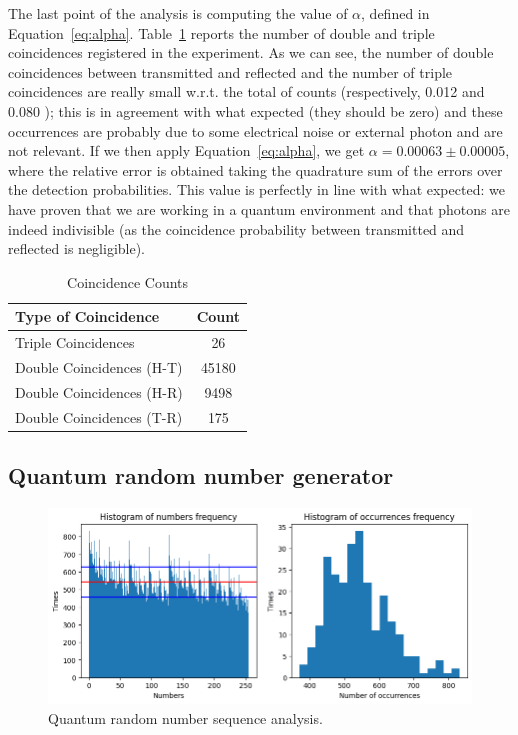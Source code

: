 \documentclass[prl,twocolumn]{revtex4-1}
\begin{document}
The last point of the analysis is computing the value of $\alpha$, defined in Equation~\eqref{eq:alpha}. Table~\ref{tab:coincidences} reports the number of double and triple coincidences registered in the experiment. As we can see, the number of double coincidences between transmitted and reflected and the number of triple coincidences are really small w.r.t. the total of counts (respectively, 0.012 \textperthousand \: and 0.080 \textperthousand); this is in agreement with what expected (they should be zero) and these occurrences are probably due to some electrical noise or external photon and are not relevant. If we then apply Equation~\eqref{eq:alpha}, we get $\alpha = 0.00063 \pm  0.00005$, where the relative error is obtained taking the quadrature sum of the errors over the detection probabilities. This value is perfectly in line with what expected: we have proven that we are working in a quantum environment and that photons are indeed indivisible (as the coincidence probability between transmitted and reflected is negligible).

\begin{table}[!t]
    \centering
    \begin{tabular}{|l||c|}
        \hline
        \textbf{Type of Coincidence} & \textbf{Count} \\
        \hline
        \hline
        Triple Coincidences & 26 \\
        \hline
        Double Coincidences (H-T) & 45180 \\
        \hline
        Double Coincidences (H-R) & 9498 \\
        \hline
        Double Coincidences (T-R) & 175 \\
        \hline
    \end{tabular}
    \caption{Coincidence Counts}
    \label{tab:coincidences}
\end{table}


\subsection{Quantum random number generator}
\begin{figure}[!b]
    \centering
    \includegraphics[width=\linewidth]{Images/qrng_stats.png}
    \caption{Quantum random number sequence analysis.}
    \label{fig:qrng_stats}
\end{figure}
\end{document}
